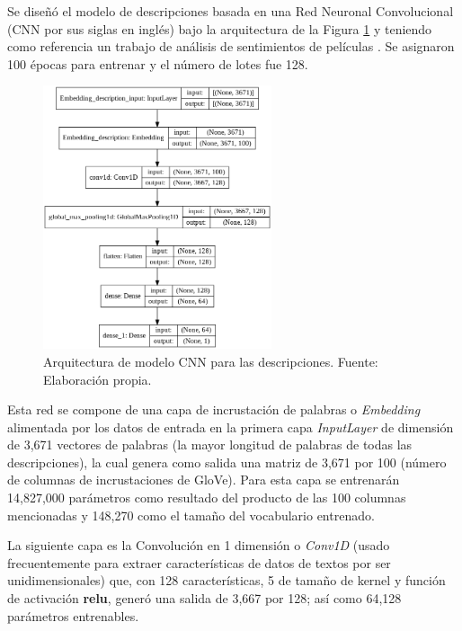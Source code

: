 Se diseñó el modelo de descripciones basada en una Red Neuronal Convolucional (CNN por sus siglas en inglés) bajo la arquitectura de la Figura \ref{4:fig39} y teniendo como referencia un trabajo de análisis de sentimientos de películas \parencite{tec_malik2019pythonnlp}. Se asignaron 100 épocas para entrenar y el número de lotes fue 128.

\begin{figure}[!ht]
	\begin{center}
		\includegraphics[width=0.60\textwidth]{4/figures/model_cnn_description.png}
		\caption{Arquitectura de modelo CNN para las descripciones. Fuente: Elaboración propia.}
		\label{4:fig39}
	\end{center}
\end{figure}

Esta red se compone de una capa de incrustación de palabras o \textit{Embedding} alimentada por los datos de entrada en la primera capa \textit{InputLayer} de dimensión de 3,671 vectores de palabras (la mayor longitud de palabras de todas las descripciones), la cual genera como salida una matriz de 3,671 por 100 (número de columnas de incrustaciones de GloVe). Para esta capa se entrenarán 14,827,000 parámetros como resultado del producto de las 100 columnas mencionadas y 148,270 como el tamaño del vocabulario entrenado.

La siguiente capa es la Convolución en 1 dimensión o \textit{Conv1D} (usado frecuentemente para extraer características de datos de textos por ser unidimensionales) que, con 128 características, 5 de tamaño de kernel y función de activación \textbf{relu}, generó una salida de 3,667 por 128; así como 64,128 parámetros entrenables.

